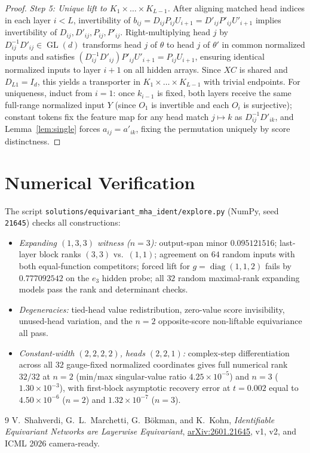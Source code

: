 \documentclass[11pt]{article}
\theoremstyle{plain}
\theoremstyle{definition}
\theoremstyle{remark}
\DeclareMathOperator{\GL}{GL}
\DeclareMathOperator{\diag}{diag}
\begin{document}
\begin{proof}
\emph{Step 5: Unique lift to $K_1 \times \dots \times K_{L-1}$.}
After aligning matched head indices in each layer $i < L$, invertibility of $b_{ij} = D_{ij} P_{ij} U_{i+1} = D'_{ij} P'_{ij} U'_{i+1}$ implies invertibility of $D_{ij}, D'_{ij}, P_{ij}, P'_{ij}$. Right-multiplying head $j$ by $D_{ij}^{-1} D'_{ij} \in \GL(d)$ transforms head $j$ of $\theta$ to head $j$ of $\theta'$ in common normalized inputs and satisfies $(D_{ij}^{-1} D'_{ij}) P'_{ij} U'_{i+1} = P_{ij} U_{i+1}$, ensuring identical normalized inputs to layer $i+1$ on all hidden arrays. Since $X C$ is shared and $D_{L1} = I_d$, this yields a transporter in $K_1 \times \dots \times K_{L-1}$ with trivial endpoints. For uniqueness, induct from $i = 1$: once $k_{i-1}$ is fixed, both layers receive the same full-range normalized input $Y$ (since $O_1$ is invertible and each $O_i$ is surjective); constant tokens fix the feature map for any head match $j \mapsto k$ as $D_{ij}^{-1} D'_{ik}$, and Lemma~\ref{lem:single} forces $a_{ij} = a'_{ik}$, fixing the permutation uniquely by score distinctness.
\end{proof}

\section{Numerical Verification}

The script \texttt{solutions/equivariant\_mha\_ident/explore.py} (NumPy, seed \texttt{21645}) checks all constructions:
\begin{itemize}[leftmargin=2em,itemsep=2pt]
\item \emph{Expanding $(1, 3, 3)$ witness ($n = 3$):} output-span minor $0.095121516$; last-layer block ranks $(3, 3)$ vs.~$(1, 1)$; agreement on $64$ random inputs with both equal-function competitors; forced lift for $g = \diag(1, 1, 2)$ fails by $0.777092542$ on the $e_3$ hidden probe; all $32$ random maximal-rank expanding models pass the rank and determinant checks.
\item \emph{Degeneracies:} tied-head value redistribution, zero-value score invisibility, unused-head variation, and the $n = 2$ opposite-score non-liftable equivariance all pass.
\item \emph{Constant-width $(2, 2, 2, 2)$, heads $(2, 2, 1)$:} complex-step differentiation across all $32$ gauge-fixed normalized coordinates gives full numerical rank $32/32$ at $n = 2$ (min/max singular-value ratio $4.25 \times 10^{-5}$) and $n = 3$ ($1.30 \times 10^{-3}$), with first-block asymptotic recovery error at $t = 0.002$ equal to $4.50 \times 10^{-6}$ ($n = 2$) and $1.32 \times 10^{-7}$ ($n = 3$).
\end{itemize}

\begin{thebibliography}{9}
V.~Shahverdi, G.~L.~Marchetti, G.~B\"okman, and K.~Kohn,
\emph{Identifiable Equivariant Networks are Layerwise Equivariant},
\href{https://arxiv.org/abs/2601.21645}{arXiv:2601.21645}, v1, v2, and ICML 2026 camera-ready.
\end{thebibliography}
\end{document}

